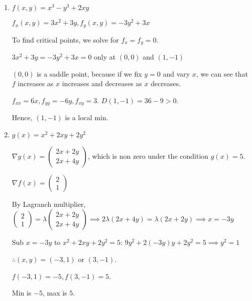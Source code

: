 \documentclass{article}
\begin{document}
\begin{enumerate}[label=(\alph*)]
\item
$f(x,y) = x^3 - y^3 + 2xy$

$f_x(x,y) = 3x^2 + 3y, f_y(x,y) = -3y^2 + 3x$

To find critical points, we solve for $f_x = f_y = 0$.

$3x^2 + 3y = -3y^2 + 3x = 0$ only at $(0,0)$ and $(1,-1)$

$(0,0)$ is a saddle point, because if we fix $y=0$ and vary $x$, we can see that $f$ increases as $x$ increases and decreases as $x$ decreases.

$f_{xx} = 6x, f_{yy} = -6y, f_{xy} = 3$. $D(1,-1) = 36 - 9 > 0$.

Hence, $(1,-1)$ is a local min.

\item
$g(x) = x^2 + 2xy + 2y^2$

$\nabla g (x) = \begin{pmatrix}
2x+2y\\2x+4y
\end{pmatrix}
$, which is non zero under the condition $g(x)=5$.

$\nabla f(x) = \begin{pmatrix}
2\\1
\end{pmatrix}
$

By Lagranch multiplier, $\begin{pmatrix}
2\\1
\end{pmatrix} = \lambda \begin{pmatrix}
2x+2y\\2x+4y
\end{pmatrix} \implies 2\lambda(2x+4y) = \lambda (2x+2y) \implies x=-3y$

Sub $x=-3y$ to $x^2 + 2xy + 2y^2=5$: $9y^2 + 2(-3y)y+2y^2 = 5 \implies y^2=1$

$\therefore (x,y) = (-3,1)$ or $(3,-1)$.

$f(-3,1)=-5, f(3,-1) = 5$.

Min is $-5$, max is $5$.

\end{enumerate}
\end{document}
